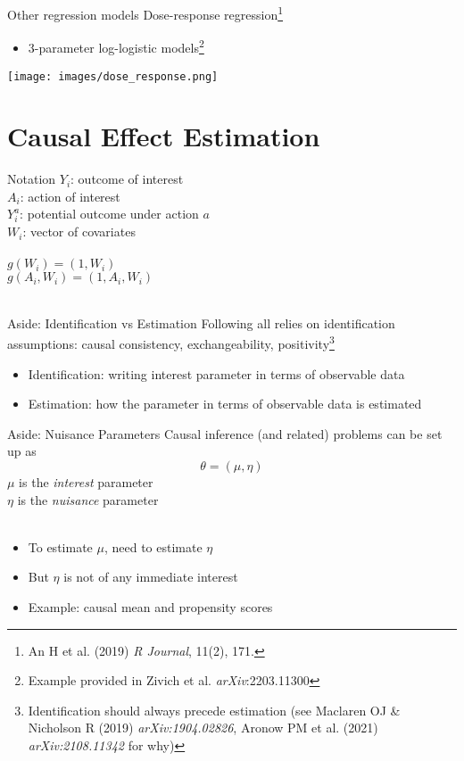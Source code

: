 \documentclass{beamer}
\begin{document}
\begin{frame}{Other regression models}
	Dose-response regression\footnote[frame]{An H et al. (2019) \textit{R Journal}, 11(2), 171.}
	\begin{itemize}
		\item 3-parameter log-logistic models\footnote[frame]{Example provided in Zivich et al. \textit{arXiv}:2203.11300}
	\end{itemize}
	\begin{center}
		\texttt{[image: images/dose\_response.png]}
	\end{center}
\end{frame}

\section{Causal Effect Estimation}

\begin{frame}{Notation}
	$Y_i$: outcome of interest\\
	$A_i$: action of interest\\
	$Y_i^a$: potential outcome under action $a$\\
	$W_i$: vector of covariates\\~\\
	$g(W_i) = (1, W_i)$ \\
	$g(A_i, W_i) = (1, A_i, W_i)$ \\~\\
\end{frame}

\begin{frame}{Aside: Identification vs Estimation}
	Following all relies on identification assumptions: causal consistency, exchangeability, positivity\footnote[frame]{Identification should always precede estimation (see Maclaren OJ \& Nicholson R (2019) \textit{arXiv:1904.02826}, Aronow PM et al. (2021) \textit{arXiv:2108.11342} for why)}
	\begin{itemize}
		\item Identification: writing interest parameter in terms of observable data
		\item Estimation: how the parameter in terms of observable data is estimated
	\end{itemize}
\end{frame}

\begin{frame}{Aside: Nuisance Parameters}
	Causal inference (and related) problems can be set up as
	\[\theta = (\mu, \eta)\]
	$\mu$ is the \textit{interest} parameter \\
	$\eta$ is the \textit{nuisance} parameter
	\\~\\
	\begin{itemize}
		\item To estimate $\mu$, need to estimate $\eta$
		\item But $\eta$ is not of any immediate interest
		\item Example: causal mean and propensity scores
	\end{itemize}
\end{frame}
\end{document}
